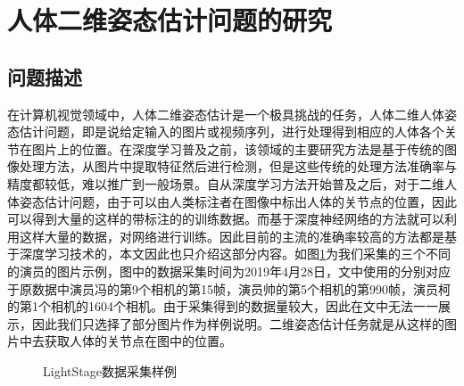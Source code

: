\newpage
\section{人体二维姿态估计问题的研究}
\subsection{问题描述}
在计算机视觉领域中，人体二维姿态估计是一个极具挑战的任务，人体二维人体姿态估计问题，即是说给定输入的图片或视频序列，进行处理得到相应的人体各个关节在图片上的位置。在深度学习普及之前，该领域的主要研究方法是基于传统的图像处理方法，从图片中提取特征然后进行检测，但是这些传统的处理方法准确率与精度都较低，难以推广到一般场景。自从深度学习方法开始普及之后，对于二维人体姿态估计问题，由于可以由人类标注者在图像中标出人体的关节点的位置，因此可以得到大量的这样的带标注的的训练数据。而基于深度神经网络的方法就可以利用这样大量的数据，对网络进行训练。因此目前的主流的准确率较高的方法都是基于深度学习技术的，本文因此也只介绍这部分内容。如图\ref{fig:2dimage}为我们采集的三个不同的演员的图片示例，图中的数据采集时间为2019年4月28日，文中使用的分别对应于原数据中演员冯的第9个相机的第15帧，演员帅的第5个相机的第990帧，演员柯的第1个相机的1604个相机。由于采集得到的数据量较大，因此在文中无法一一展示，因此我们只选择了部分图片作为样例说明。二维姿态估计任务就是从这样的图片中去获取人体的关节点在图中的位置。

\begin{figure}[htbp]
    \centering
    \caption{LightStage数据采集样例\label{fig:2dimage}}
\end{figure}

